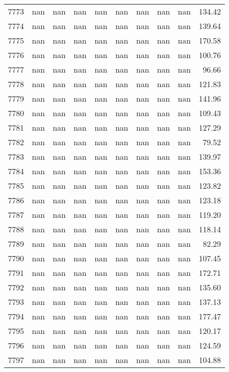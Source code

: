 \begin{tabular}{lrrrrrrrrr}
7773 & nan & nan & nan & nan & nan & nan & nan & nan & 134.42 \\
7774 & nan & nan & nan & nan & nan & nan & nan & nan & 139.64 \\
7775 & nan & nan & nan & nan & nan & nan & nan & nan & 170.58 \\
7776 & nan & nan & nan & nan & nan & nan & nan & nan & 100.76 \\
7777 & nan & nan & nan & nan & nan & nan & nan & nan & 96.66 \\
7778 & nan & nan & nan & nan & nan & nan & nan & nan & 121.83 \\
7779 & nan & nan & nan & nan & nan & nan & nan & nan & 141.96 \\
7780 & nan & nan & nan & nan & nan & nan & nan & nan & 109.43 \\
7781 & nan & nan & nan & nan & nan & nan & nan & nan & 127.29 \\
7782 & nan & nan & nan & nan & nan & nan & nan & nan & 79.52 \\
7783 & nan & nan & nan & nan & nan & nan & nan & nan & 139.97 \\
7784 & nan & nan & nan & nan & nan & nan & nan & nan & 153.36 \\
7785 & nan & nan & nan & nan & nan & nan & nan & nan & 123.82 \\
7786 & nan & nan & nan & nan & nan & nan & nan & nan & 123.18 \\
7787 & nan & nan & nan & nan & nan & nan & nan & nan & 119.20 \\
7788 & nan & nan & nan & nan & nan & nan & nan & nan & 118.14 \\
7789 & nan & nan & nan & nan & nan & nan & nan & nan & 82.29 \\
7790 & nan & nan & nan & nan & nan & nan & nan & nan & 107.45 \\
7791 & nan & nan & nan & nan & nan & nan & nan & nan & 172.71 \\
7792 & nan & nan & nan & nan & nan & nan & nan & nan & 135.60 \\
7793 & nan & nan & nan & nan & nan & nan & nan & nan & 137.13 \\
7794 & nan & nan & nan & nan & nan & nan & nan & nan & 177.47 \\
7795 & nan & nan & nan & nan & nan & nan & nan & nan & 120.17 \\
7796 & nan & nan & nan & nan & nan & nan & nan & nan & 124.59 \\
7797 & nan & nan & nan & nan & nan & nan & nan & nan & 104.88 \\

\end{tabular}
